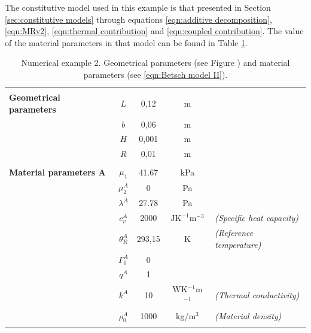 The constitutive model used in this example is that presented in Section \ref{sec:constitutive models} through equations \eqref{eqn:additive decomposition}, \eqref{eqn:MRv2}, \eqref{eqn:thermal contribution} and \eqref{eqn:coupled contribution}. The value of the material parameters in that model can be found in {Table \ref{table:Bending actuator parameters}}.

\begin{table}[htbp]
	\centering
	\caption{Numerical example 2. Geometrical parameters (see Figure \Blue{\ref{fig:Bending actuator geometry}}) and material parameters (see \eqref{eqn:Betsch model II}).}
	\label{table:Bending actuator parameters}
	\vspace{2mm}
	\begin{tabular}{l | c c c l|}
		\cellcolor{gray!15}&&&&\\
		\cellcolor{gray!15}\textbf{Geometrical parameters}  &  $L$ &  0,12  &  m  &		\\
		\cellcolor{gray!15} &  $b$ & 0,06 & m &\\
		\cellcolor{gray!15} &  $H$ & 0,001 & m &\\		
		\cellcolor{gray!15}&  $R$ & 0,01 & m &\\
		\hline
		\cellcolor{gray!15}&&&\\
		\cellcolor{gray!15}\textbf{Material parameters A} &   $\mu_1$ &  41.67  &  kPa &
		\\
		\cellcolor{gray!15}&   $\mu^A_2$ & 0 & Pa &\\ %
		\cellcolor{gray!15}&  $\lambda^A$ & 27.78 & Pa &\\
		\cellcolor{gray!15}&  $c^A_v$ & 2000 & $\text{J}\text{K}^{-1}\text{m}^{-3}$& \textit{(Specific heat capacity)}\\
		\cellcolor{gray!15}&  $\theta^A_R$ & 293,15 & K& \textit{(Reference temperature)}\\
		\cellcolor{gray!15}&  $\Gamma^A_0$ & $0$ & &\\
		\cellcolor{gray!15}&  $q^A$ & 1 & &\\
		\cellcolor{gray!15}&  $k^A$ & 10 & WK$^{-1}$m$^{-1}$& \textit{(Thermal conductivity)}\\	
		\cellcolor{gray!15}&  $\rho^A_0$ & 1000 & kg/$\text{m}^3$& \textit{(Material density)}\\				
		\hline
		\cellcolor{gray!15}&&&\\
		

\end{tabular}
\end{table}
